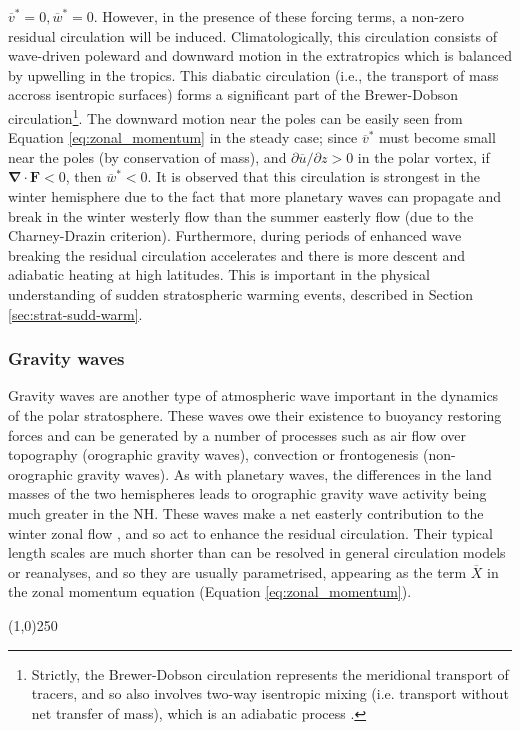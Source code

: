 $\overline{v}^*=0, \overline{w}^*=0$.  However, in the presence of these forcing
terms, a non-zero residual circulation will be induced. Climatologically, this
circulation consists of wave-driven poleward and downward motion in the
extratropics which is balanced by upwelling in the tropics. This diabatic
circulation (i.e., the transport of mass accross isentropic surfaces) forms a
significant part of the Brewer-Dobson circulation\footnote{Strictly, the
  Brewer-Dobson circulation represents the meridional transport of tracers, and
  so also involves two-way isentropic mixing (i.e. transport without net
  transfer of mass), which is an adiabatic process \citep{Hall1994}.}. The
downward motion near the poles can be easily seen from Equation
\ref{eq:zonal_momentum} in the steady case; since $\overline{v}^*$ must become
small near the poles (by conservation of mass), and
$\partial\overline{u}/\partial z > 0$ in the polar vortex, if
$\mathbf{\nabla\cdot F} < 0$, then $\overline{w}^*<0$. It is observed that this
circulation is strongest in the winter hemisphere due to the fact that more
planetary waves can propagate and break in the winter westerly flow than the
summer easterly flow (due to the Charney-Drazin criterion). Furthermore, during
periods of enhanced wave breaking the residual circulation accelerates and there
is more descent and adiabatic heating at high latitudes. This is important in
the physical understanding of sudden stratospheric warming events, described in
Section \ref{sec:strat-sudd-warm}.


\subsubsection{Gravity waves}

Gravity waves are another type of atmospheric wave important in the dynamics of
the polar stratosphere. These waves owe their existence to buoyancy restoring
forces and can be generated by a number of processes such as air flow over
topography (orographic gravity waves), convection or frontogenesis
(non-orographic gravity waves). As with planetary waves, the differences in the
land masses of the two hemispheres leads to orographic gravity wave activity
being much greater in the NH. These waves make a net easterly contribution to
the winter zonal flow \citep[e.g.,][]{Seviour2012}, and so act to enhance the
residual circulation. Their typical length scales are much shorter than can be
resolved in general circulation models or reanalyses, and so they are usually
parametrised, appearing as the term $\overline{X}$ in the zonal momentum
equation (Equation \ref{eq:zonal_momentum}).
\begin{center}
\line(1,0){250}
\end{center}

